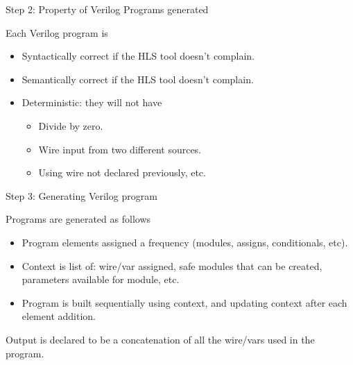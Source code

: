 \documentclass[notes, xcolor=dvipsnames]{beamer}
\begin{document}
    \begin{frame}{Step 2: Property of Verilog Programs generated}

        Each Verilog program is 
        \begin{itemize}
            \item Syntactically correct if the HLS tool doesn't complain. 
            \item Semantically correct if the HLS tool doesn't complain. 
            \item Deterministic: they will not have 
                \begin{itemize}
                    \item Divide by zero.
                    \item Wire input from two different sources.
                    \item Using wire not declared previously, etc.
                \end{itemize} 

        \end{itemize}

    \end{frame}

    \begin{frame}{Step 3: Generating Verilog program}

        Programs are generated as follows
        \begin{itemize}
            \item Program elements assigned a frequency (modules, assigns, conditionals, etc).
            \item Context is list of: wire/var assigned, safe modules that can be created, parameters available for module, etc.
            \item Program is built sequentially using context, and updating context after each element addition.
        \end{itemize}

        Output is declared to be a concatenation of all the wire/vars used in the program. 

    \end{frame}
\end{document}
